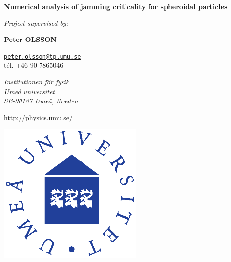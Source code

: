 \documentclass[class=report, float=false, crop=false]{standalone}
\begin{document}
\begin{center}



\vspace{1.5cm}

\textbf{\huge Numerical analysis of jamming criticality for spheroidal particles}



\vspace{2cm}

\parbox{15cm}{

\begin{center}

{\it \small Project supervised by:}

\vspace{0.4cm}

\begin{minipage}{0.3\textwidth}
\centering

{\bf Peter OLSSON}

\href{mailto:peter.olsson@tp.umu.se}{\tt peter.olsson@tp.umu.se} \\ tél. +46 90 7865046


{\it Institutionen för fysik \\ Umeå universitet \\ SE-90187 Umeå, Sweden}

\url{http://physics.umu.se/}

\end{minipage}

\end{center}
} %

\vspace{0.5cm}

\includegraphics[height=7cm]{Umea_University.eps}

\end{center}

\vfill
\newpage
\end{document}
